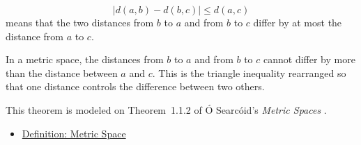 \begin{remark*}
\[
\bigl|d(a,b)-d(b,c)\bigr|\leq d(a,c)
\]
means that the two distances from \(b\) to \(a\) and from \(b\) to \(c\)
differ by at most the distance from \(a\) to \(c\).
\end{remark*}

\begin{remark*}[Interpretation]
In a metric space, the distances from \(b\) to \(a\) and from \(b\) to \(c\)
cannot differ by more than the distance between \(a\) and \(c\).  This is the
triangle inequality rearranged so that one distance controls the difference
between two others.
\end{remark*}

\begin{remark*}
This theorem is modeled on Theorem~1.1.2 of
{\'O} Searc{\'o}id's \emph{Metric Spaces} \cite{OSearcoidMetricSpaces}.
\end{remark*}


\begin{dependencies}
\begin{itemize}
  \item \hyperref[def:metric-space]{Definition: Metric Space}
\end{itemize}
\end{dependencies}
